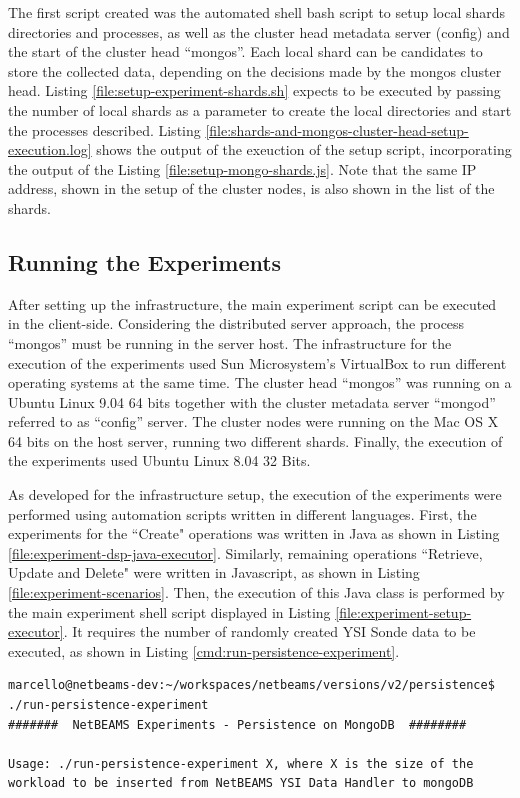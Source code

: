 The first script created was the automated shell bash script to setup local
shards directories and processes, as well as the cluster head metadata server
(config) and the start of the cluster head ``mongos''. Each local shard can be
candidates to store the collected data, depending on the decisions made by the
mongos cluster head. Listing \ref{file:setup-experiment-shards.sh} expects to be
executed by passing the number of local shards as a parameter to create the
local directories and start the processes described. Listing
\ref{file:shards-and-mongos-cluster-head-setup-execution.log} shows the output
of the exeuction of the setup script, incorporating the output of the Listing
\ref{file:setup-mongo-shards.js}. Note that the same IP address, shown in the
setup of the cluster nodes, is also shown in the list of the shards.

\subsection{Running the Experiments}

After setting up the infrastructure, the main experiment script can be executed
in the client-side. Considering the distributed server approach, the process
``mongos'' must be running in the server host. The infrastructure for the
execution of the experiments used Sun Microsystem's VirtualBox to run different
operating systems at the same time. The cluster head ``mongos'' was running on
a Ubuntu Linux 9.04 64 bits together with the cluster metadata server
``mongod'' referred to as ``config'' server. The cluster nodes were running on
the Mac OS X 64 bits on the host server, running two different shards. Finally,
the execution of the experiments used Ubuntu Linux 8.04 32 Bits.

As developed for the infrastructure setup, the execution of the experiments
were performed using automation scripts written in different languages.
First, the experiments for the ``Create" operations was written in Java
as shown in Listing \ref{file:experiment-dsp-java-executor}. Similarly,
remaining operations ``Retrieve, Update and Delete" were written in
Javascript, as shown in Listing \ref{file:experiment-scenarios}. Then, the
execution of this Java class is performed by the main experiment shell script
displayed in Listing \ref{file:experiment-setup-executor}. It requires the
number of randomly created YSI Sonde data to be executed, as shown in Listing
\ref{cmd:run-persistence-experiment}.

\lstset{label=cmd:run-persistence-experiment,caption=Running main experiment
shell script}
\begin{lstlisting}
marcello@netbeams-dev:~/workspaces/netbeams/versions/v2/persistence$ ./run-persistence-experiment 
#######  NetBEAMS Experiments - Persistence on MongoDB  ########

Usage: ./run-persistence-experiment X, where X is the size of the workload to be inserted from NetBEAMS YSI Data Handler to mongoDB
\end{lstlisting}

